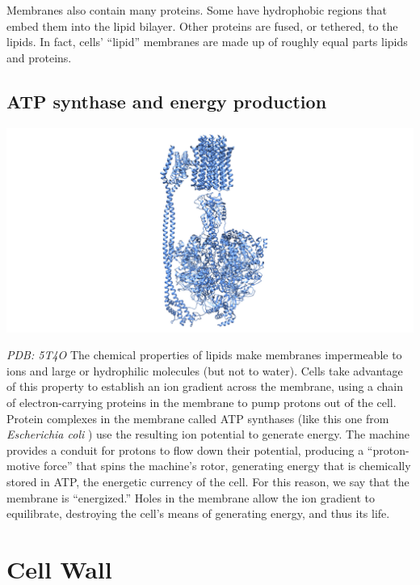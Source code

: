 \documentclass[]{tufte-book}
\begin{document}
Membranes also contain many proteins. Some have hydrophobic regions that
embed them into the lipid bilayer. Other proteins are fused, or
tethered, to the lipids. In fact, cells' ``lipid'' membranes are made up
of roughly equal parts lipids and proteins.

\subsection{ATP synthase and energy
production}\label{ATP_synthase_and_energy_production}

\includegraphics{img/schematics/2_1_2}

\emph{PDB: 5T4O} The chemical properties of lipids make membranes
impermeable to ions and large or hydrophilic molecules (but not to
water). Cells take advantage of this property to establish an ion
gradient across the membrane, using a chain of electron-carrying
proteins in the membrane to pump protons out of the cell. Protein
complexes in the membrane called ATP synthases (like this one from
\emph{Escherichia coli} \citep{sobti2016}) use the resulting ion
potential to generate energy. The machine provides a conduit for protons
to flow down their potential, producing a ``proton-motive force'' that
spins the machine's rotor, generating energy that is chemically stored
in ATP, the energetic currency of the cell. For this reason, we say that
the membrane is ``energized.'' Holes in the membrane allow the ion
gradient to equilibrate, destroying the cell's means of generating
energy, and thus its life.

\section{Cell Wall}\label{cell-wall}
\end{document}
